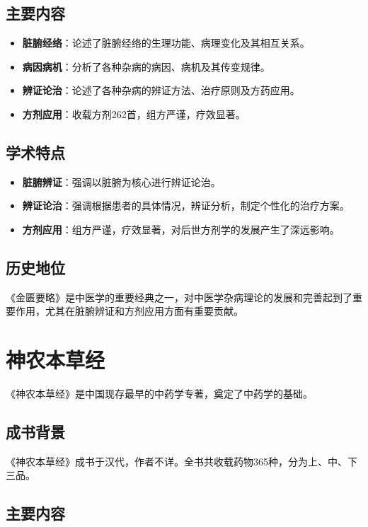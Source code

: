 \documentclass[12pt,UTF8]{ctexbook}
\begin{document}
\subsection{主要内容}

\begin{itemize}
\item \textbf{脏腑经络}：论述了脏腑经络的生理功能、病理变化及其相互关系。
\item \textbf{病因病机}：分析了各种杂病的病因、病机及其传变规律。
\item \textbf{辨证论治}：论述了各种杂病的辨证方法、治疗原则及方药应用。
\item \textbf{方剂应用}：收载方剂262首，组方严谨，疗效显著。
\end{itemize}

\subsection{学术特点}

\begin{itemize}
\item \textbf{脏腑辨证}：强调以脏腑为核心进行辨证论治。
\item \textbf{辨证论治}：强调根据患者的具体情况，辨证分析，制定个性化的治疗方案。
\item \textbf{方剂应用}：组方严谨，疗效显著，对后世方剂学的发展产生了深远影响。
\end{itemize}

\subsection{历史地位}

《金匮要略》是中医学的重要经典之一，对中医学杂病理论的发展和完善起到了重要作用，尤其在脏腑辨证和方剂应用方面有重要贡献。

\section{神农本草经}

《神农本草经》是中国现存最早的中药学专著，奠定了中药学的基础。

\subsection{成书背景}

《神农本草经》成书于汉代，作者不详。全书共收载药物365种，分为上、中、下三品。

\subsection{主要内容}
\end{document}
